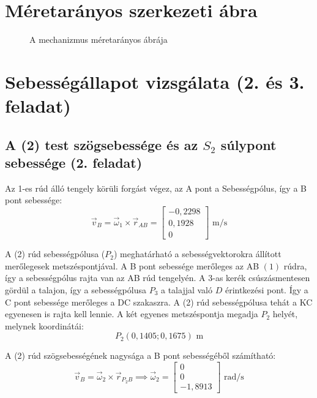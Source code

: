 \documentclass[fleqn,12pt]{article}
\begin{document}
% 


\section{Méretarányos szerkezeti ábra}
\begin{figure}[H]
    \centering
    
    \caption{A mechanizmus méretarányos ábrája}
\end{figure}

\section{Sebességállapot vizsgálata (2. és 3. feladat)}
\subsection{A (2) test szögsebessége és az $S_2$ súlypont sebessége (2. feladat)}
Az 1-es rúd álló tengely körüli forgást végez, az A pont a Sebességpólus, így a B pont sebessége:
\begin{equation}
    \vec{v}_B = \vec{\omega}_1 \times \vec{r}_{AB} = \begin{bmatrix} -0,2298 \\ 0,1928 \\ 0 \end{bmatrix} \text{ m/s}
\end{equation}

A (2) rúd sebességpólusa ($P_2$) meghatárható a sebességvektorokra állított merőlegesek metszéspontjával.
A B pont sebessége merőleges az AB $(1)$ rúdra, így a sebességpólus rajta van az AB rúd tengelyén. 
A 3-as kerék csúszásmentesen gördül a talajon, így a sebességpólusa $P_3$ a talajjal való $D$ érintkezési pont. Így a C pont sebessége merőleges a DC szakaszra. A (2) rúd sebességpólusa tehát a KC egyenesen is rajta kell lennie.
A két egyenes metszéspontja megadja $P_2$ helyét, melynek koordinátái:
\begin{equation}
    P_2(0,1405; 0,1675)\text{ m}
\end{equation}

A (2) rúd szögsebességének nagysága a B pont sebességéből számítható:
\begin{equation}
    \vec{v}_B = \vec{\omega}_2 \times \vec{r}_{P_2B} \implies \vec{\omega}_2 = \begin{bmatrix} 0 \\ 0 \\ -1,8913 \end{bmatrix} \text{ rad/s}
\end{equation}
\end{document}
